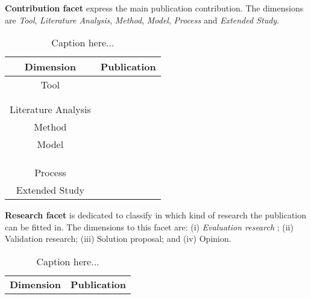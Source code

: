 \begin{description}
\begin{table}[h]
\begin{center}
\begin{tabular}{|c|c|}
\hline 
\end{tabular}
\end{center}
\end{table}
\item \textbf{Contribution facet} express the main publication contribution. 
The dimensions are \textit{Tool}, \textit{Literature Analysis}, \textit{Method}, \textit{Model}, \textit{Process} and \textit{Extended Study}.
\begin{table}[h]
\caption{Caption here...}
\begin{center}
\begin{tabular}{|c|c|}
\hline 
\textbf{Dimension} & \textbf{Publication} \\ 
\hline 
Tool & \cite{001,002,005,011,014,015,016,019,024,026,028,029,032,035,046,053,054} \\
     & \cite{056,061,064,065,066,068,070,071,074,077,078} \\ 
     & \cite{081,086,087,088,091,093,094,095,110,112,113} \\ 
\hline 
Literature Analysis & \cite{003,004,010,038,042,048,052,069,073,089,099,103,105,108,109,111} \\ 
\hline 
Method & \cite{011,043,051,075,076,092,101,102,106,107} \\ 
\hline 
Model & \cite{006,007,008,009,012,013,017,018,020,027,030,031,033,034,036,037} \\
      & \cite{039,040,041,044,045,049,050,055,056,057,058,059,060} \\
      & \cite{062,063,066,067,070,071,072,079,080,082,083,084,085,087,088} \\ 
      & \cite{090,096,098,114} \\  
\hline 
Process & \cite{021,022,023,025,096,100} \\ 
\hline 
Extended Study & \cite{047,097,104} \\ 
\hline 
\end{tabular}
\end{center}
\end{table}
\item \textbf{Research facet} is dedicated to classify in which kind of research the publication can be fitted in. The dimensions to this facet are: (i) \textit{Evaluation research} ; (ii) Validation research; (iii) Solution proposal; and (iv) Opinion.
\begin{table}[h]
\caption{Caption here...}
\begin{center}
\begin{tabular}{|c|c|}
\hline 
\textbf{Dimension} & \textbf{Publication} \\ 

\end{tabular}
\end{center}
\end{table}
\end{description}
